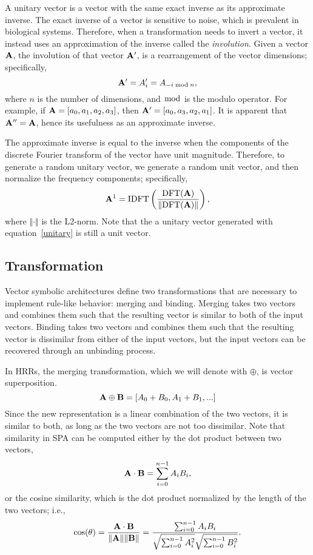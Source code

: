 {A unitary vector is a vector with
the same exact inverse
as its approximate inverse.
The exact inverse of a vector
is sensitive to noise,
which is prevalent in biological systems.
Therefore, when a transformation needs to
invert a vector,
it instead uses an approximation
of the inverse called the \textit{involution}.
Given a vector $\mathbf{A}$, the involution
of that vector $\mathbf{A'}$,
is a rearrangement of the vector dimensions;
specifically,
\begin{equation}
  \mathbf{A'} = A'_{i} = A_{-i \bmod n},
\end{equation}
where $n$ is the number of dimensions,
and $\bmod$ is the modulo operator.
For example, if $\mathbf{A} = [a_0, a_1, a_2, a_3]$,
then $\mathbf{A'} = [a_0, a_3, a_2, a_1]$.
It is apparent that $\mathbf{A''} = \mathbf{A}$,
hence its usefulness as an approximate inverse.

The approximate inverse is equal to the
inverse when the components
of the discrete Fourier transform
of the vector have unit magnitude.
Therefore, to generate a random unitary vector,
we generate a random unit vector,
and then normalize
the frequency components;
specifically,
\begin{equation} \label{unitary}
  \mathbf{A}^1 = \text{IDFT}\left(
    \frac{\text{DFT}(\mathbf{A})}{\Vert\text{DFT}(\mathbf{A})\Vert}\right),
\end{equation}
where $\Vert\cdot\Vert$ is the L2-norm.
Note that the a unitary vector generated
with equation~\eqref{unitary}
is still a unit vector.

\subsection{Transformation}

Vector symbolic architectures
define two transformations
that are necessary
to implement rule-like behavior:
merging and binding.
Merging takes two vectors
and combines them such that
the resulting vector
is similar to both of the input vectors.
Binding takes two vectors
and combines them such that
the resulting vector
is dissimilar from either of the input vectors,
but the input vectors can be recovered
through an unbinding process.

In HRRs,
the merging transformation,
which we will denote with $\oplus$,
is vector superposition.
\begin{equation}
  \mathbf{A} \oplus \mathbf{B} = [A_0 + B_0, A_1 + B_1, ...]
\end{equation}
Since the new representation
is a linear combination of
the two vectors,
it is similar to both,
as long as the two vectors
are not too dissimilar.
Note that similarity in SPA can
be computed either by
the dot product between two vectors,
\begin{equation}
  \mathbf{A} \cdot \mathbf{B} = \sum_{i=0}^{n-1} A_i B_i,
\end{equation}
or the cosine similarity,
which is the dot product normalized
by the length of the two vectors; i.e.,
\begin{equation}
  \cos(\theta) = \frac{\mathbf{A} \cdot \mathbf{B}}{\Vert\mathbf{A}\Vert \Vert\mathbf{B}\Vert}
    = \frac{\sum_{i=0}^{n-1} A_i B_i}
           {\sqrt{\sum_{i=0}^{n-1} A_i^2} \sqrt{\sum_{i=0}^{n-1} B_i^2}}.
\end{equation}

}
